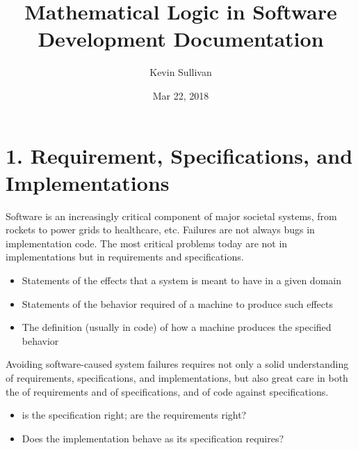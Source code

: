 \documentclass[letterpaper,10pt,english]{sphinxmanual}
\title{Mathematical Logic in Software Development Documentation}
\date{Mar 22, 2018}
\author{Kevin Sullivan}
\begin{document}
\maketitle
\sphinxtableofcontents
{}\label{\detokenize{index::doc}}



\chapter{1. Requirement, Specifications, and Implementations}
\label{\detokenize{01-reqs-specs-impls::doc}}\label{\detokenize{01-reqs-specs-impls:welcome-to-mathematical-logic-in-software-development}}\label{\detokenize{01-reqs-specs-impls:requirement-specifications-and-implementations}}
Software is an increasingly critical component of major societal
systems, from rockets to power grids to healthcare, etc. Failures are
not always bugs in implementation code. The most critical problems
today are not in implementations but in requirements and
specifications.
\begin{itemize}
\item {} 
 Statements of the effects that a system is meant to have in a given domain

\item {} 
 Statements of the behavior required of a machine to produce such effects

\item {} 
 The definition (usually in code) of how a machine produces the specified behavior

\end{itemize}

Avoiding software-caused system failures requires not only a solid
understanding of requirements, specifications, and implementations,
but also great care in both the  of requirements and of
specifications, and  of code against specifications.
\begin{itemize}
\item {} 
  is the specification right; are the requirements right?

\item {} 
  Does the implementation behave as its specification requires?

\end{itemize}
\end{document}
